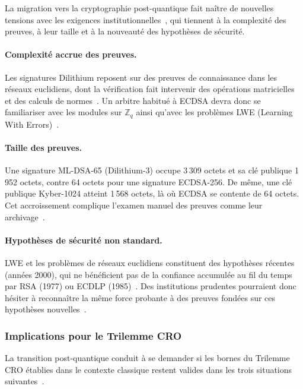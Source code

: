 \begin{sloppypar}
La migration vers la cryptographie post-quantique fait na\^itre de nouvelles
tensions avec les exigences institutionnelles~\cite{Langlois2015,Boneh2011}, qui tiennent \`a la complexit\'e des preuves, \`a leur taille et \`a la nouveaut\'e des hypoth\`eses de s\'ecurit\'e.

\paragraph{Complexit\'e accrue des preuves.}
Les signatures Dilithium reposent sur des preuves de connaissance dans les r\'eseaux
euclidiens, dont la v\'erification fait intervenir des op\'erations matricielles et des
calculs de normes~\cite{Dilithium2022}. Un arbitre habitu\'e \`a ECDSA devra donc se familiariser avec les
modules sur $\mathbb{Z}_q$ ainsi qu'avec les probl\`emes LWE (Learning With Errors)~\cite{Regev2009}.

\paragraph{Taille des preuves.}
Une signature ML-DSA-65 (Dilithium-3) occupe 3\,309 octets et sa cl\'e publique 1\,952 octets, contre 64 octets pour une signature ECDSA-256.
De m\^eme, une cl\'e publique Kyber-1024 atteint 1\,568 octets, l\`a o\`u ECDSA se contente de 64 octets.
Cet accroissement complique l'examen manuel des preuves comme leur archivage~\cite{Ravi2020}.

\paragraph{Hypoth\`eses de s\'ecurit\'e non standard.}
LWE et les probl\`emes de r\'eseaux euclidiens constituent des hypoth\`eses r\'ecentes
(ann\'ees 2000), qui ne b\'en\'eficient pas de la confiance accumul\'ee au fil du temps par RSA (1977) ou
ECDLP (1985)~\cite{Kiltz2017}. Des institutions prudentes pourraient donc h\'esiter \`a reconna\^itre la m\^eme
force probante \`a des preuves fond\'ees sur ces hypoth\`eses nouvelles~\cite{Unruh2016}.

\subsubsection{Implications pour le Trilemme CRO}
\label{subsubsec:implications_cro}

La transition post-quantique conduit \`a se demander si les bornes du Trilemme CRO
\'etablies dans le contexte classique restent valides dans les trois situations
suivantes~\cite{NielsenChuang2010,Wilde2017}.


\end{sloppypar}
